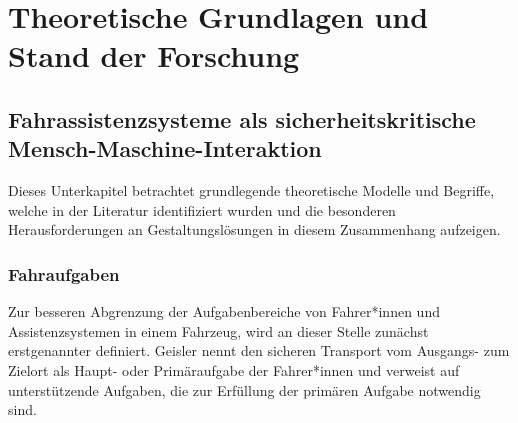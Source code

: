 \chapter{Theoretische Grundlagen und Stand der Forschung}
\label{chapter:related_work}


\section{Fahrassistenzsysteme als sicherheitskritische
Mensch-Maschine-Interaktion}
\label{sec:fas_sicherheitskritisch}
Dieses Unterkapitel betrachtet grundlegende theoretische Modelle und Begriffe, welche in der Literatur \cite{Geisler_hci2021} identifiziert wurden und die besonderen Herausforderungen an Gestaltungslösungen in diesem Zusammenhang aufzeigen.

\subsection{Fahraufgaben}
\label{subsec:fahraufgabe}
Zur besseren Abgrenzung der Aufgabenbereiche von Fahrer*innen und Assistenzsystemen in einem Fahrzeug, wird an dieser Stelle zunächst erstgenannter definiert. Geisler \cite{Geisler_hci2021} nennt den sicheren Transport vom Ausgangs- zum Zielort als Haupt- oder Primäraufgabe der Fahrer*innen und verweist auf unterstützende Aufgaben, die zur Erfüllung der primären Aufgabe notwendig sind.

